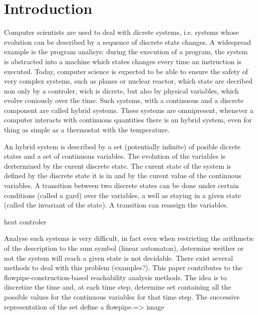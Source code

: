 \section{Introduction}
Computer scientists are used to deal with dicrete systems, i.e. systems whose evolution can be described by a sequence of discrete state changes. A widespread example is the program analisys: during the execution of a program, the system is abstracted into a machine which states changes every time an instruction is executed.
Today, computer science is expected to be able to ensure the safety of very complex systems, such as planes or nuclear reactor, which state are decribed non only by a controler, wich is dicrete, but also by physical variables, which evolve coniously over the time. Such systems, with a continuous and a discrete component are called hybrid systems. These systems are omnipresent, whenever a computer interacts with continuous quantities there is an hybrid system, even for thing as simple as a thermostat with the temperature.

An hybrid system is described by a set (potentially infinite) of posible dicrete states and a set of continuous variables. The evolution of the variables is dertermined by the curent discrete state. The curent state of the system is defined by the discrete state it is in and by the curent value of the continuous variables. A transition between two discrete states can be done under certain conditions (called a gard) over the variables, a well as staying in a given state (called the invariant of the state). A transition can reassign the variables.  

\begin{example} heat controler
\end{example}

Analyse such systems is very difficult, in fact even when restricting the arithmetic of the description to the sum symbol (linear automaton), determine weither or not the system will reach a given state is not decidable. There exist several methods to deal with this problem (examples?). This paper contributes to the flowpipe-construction-based reachability analysis methods. The idea is to discretize the time and, at each time step, determine set containing all the possible values for the continuous variables for that time step. The successive representation of the set define a flowpipe.=> image








